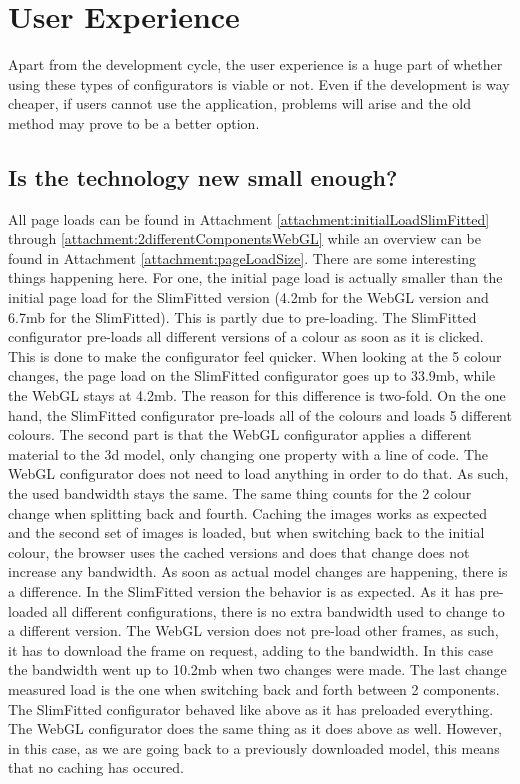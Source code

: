\section{User Experience}
Apart from the development cycle, the user experience is a huge part of whether using these types of configurators is viable or not. Even if the development is way cheaper, if users cannot use the application, problems will arise and the old method may prove to be a better option.

\subsection {Is the technology new small enough?}
All page loads can be found in Attachment \ref{attachment:initialLoadSlimFitted} through \ref{attachment:2differentComponentsWebGL} while an overview can be found in Attachment \ref{attachment:pageLoadSize}. There are some interesting things happening here. For one, the initial page load is actually smaller than the initial page load for the SlimFitted version (4.2mb for the WebGL version and 6.7mb for the SlimFitted). This is partly due to pre-loading. The SlimFitted configurator pre-loads all different versions of a colour as soon as it is clicked. This is done to make the configurator feel quicker. \newline
When looking at the 5 colour changes, the page load on the SlimFitted configurator goes up to 33.9mb, while the WebGL stays at 4.2mb. The reason for this difference is two-fold. On the one hand, the SlimFitted configurator pre-loads all of the colours and loads 5 different colours. The second part is that the WebGL configurator applies a different material to the 3d model, only changing one property with a line of code. The WebGL configurator does not need to load anything in order to do that. As such, the used bandwidth stays the same.\newline
The same thing counts for the 2 colour change when splitting back and fourth. Caching the images works as expected and the second set of images is loaded, but when switching back to the initial colour, the browser uses the cached versions and does that change does not increase any bandwidth.\newline
As soon as actual model changes are happening, there is a difference. In the SlimFitted version the behavior is as expected. As it has pre-loaded all different configurations, there is no extra bandwidth used to change to a different version. The WebGL version does not pre-load other frames, as such, it has to download the frame on request, adding to the bandwidth. In this case the bandwidth went up to 10.2mb when two changes were made. \newline
The last change measured load is the one when switching back and forth between 2 components. The SlimFitted configurator behaved like above as it has preloaded everything. The WebGL configurator does the same thing as it does above as well. However, in this case, as we are going back to a previously downloaded model, this means that no caching has occured.


